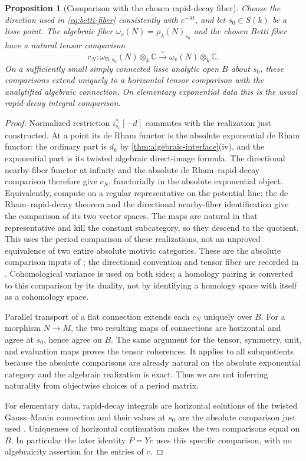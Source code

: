 \documentclass[11pt]{article}
\numberwithin{equation}{section}
\newtheorem{proposition}[proposition]{Proposition}
\theoremstyle{definition}
\theoremstyle{remark}
\newcommand{\C}{\mathbb C}
\newcommand{\B}{\mathrm B}
\begin{document}
\begin{proposition}[Comparison with the chosen rapid-decay fiber]
\label{prop:relative-Betti-interface}
Choose the direction used in \eqref{eq:betti-fiber} consistently with
$e^{-\lambda t}$, and let $s_0\in S(k)$ be a lisse point. The algebraic
fiber $\omega_{v}(N)=\rho_\lambda(N)_{s_0}$ and the chosen Betti fiber
have a natural tensor comparison
\[
 c_N:\omega_{\B,s_0}(N)\otimes_k\C
       \xrightarrow{\sim}\omega_v(N)\otimes_k\C.
\]
On a sufficiently small simply connected lisse analytic open $B$ about
$s_0$, these comparisons extend uniquely to a horizontal tensor
comparison with the analytified algebraic connection. On elementary
exponential data this is the usual rapid-decay integral comparison.
\end{proposition}
\begin{proof}
Normalized restriction $i_{s_0}^*[-d]$ commutes with the realization just
constructed. At a point its de Rham functor is the absolute exponential
de Rham functor: the ordinary part is $d_k$ by
\cref{thm:algebraic-interface}(iv), and the exponential part is its
twisted algebraic direct-image formula. The directional nearby-fiber
functor at infinity and the absolute de Rham--rapid-decay comparison
therefore give $c_N$, functorially in the absolute exponential object.
Equivalently, compute on a regular representative on the potential line:
the de Rham--rapid-decay theorem and the directional nearby-fiber
identification give the comparison of its two vector spaces. The maps
are natural in that representative and kill the constant subcategory, so
they descend to the quotient. This uses the period comparison of these
realizations, not an unproved equivalence of two entire absolute motivic
categories.
These are the absolute comparison inputs of
\cite{FresanJossenExp,Hien}; the directional convention and tensor fiber
are recorded in \cite[Definition~3.5 and Theorem~3.6]{Snodgrass}.
Cohomological variance is used on both sides; a homology pairing is
converted to this comparison by its duality, not by identifying a homology
space with itself as a cohomology space.

Parallel transport of a flat connection extends each $c_N$ uniquely over
$B$. For a morphism $N\to M$, the two resulting maps of connections are
horizontal and agree at $s_0$, hence agree on $B$. The same argument for
the tensor, symmetry, unit, and evaluation maps proves the tensor
coherences. It applies to all subquotients because the absolute comparisons
are already natural on the absolute exponential category and the
algebraic realization is exact. Thus we are not inferring naturality from
objectwise choices of a period matrix.

For elementary data, rapid-decay integrals are horizontal solutions of
the twisted Gauss--Manin connection and their values at $s_0$ are the
absolute comparison just used \cite{HienRoucairol,Hien}. Uniqueness of
horizontal continuation makes the two comparisons equal on $B$. In
particular the later identity $P=Yc$ uses this specific comparison, with
no algebraicity assertion for the entries of $c$.
\end{proof}
\end{document}
